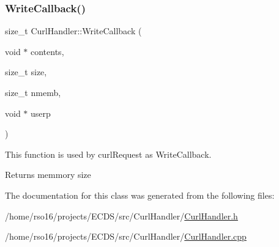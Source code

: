 \subsubsection{\texorpdfstring{Write\+Callback()}{WriteCallback()}}
{\footnotesize\ttfamily size\+\_\+t Curl\+Handler\+::\+Write\+Callback (\begin{DoxyParamCaption}\item[{void $\ast$}]{contents,  }\item[{size\+\_\+t}]{size,  }\item[{size\+\_\+t}]{nmemb,  }\item[{void $\ast$}]{userp }\end{DoxyParamCaption})\hspace{0.3cm}{\ttfamily [static]}}



This function is used by curl\+Request as Write\+Callback. 

\begin{DoxyReturn}{Returns}
memmory size 
\end{DoxyReturn}


The documentation for this class was generated from the following files\+:\begin{DoxyCompactItemize}
\item 
/home/rso16/projects/\+E\+C\+D\+S/src/\+Curl\+Handler/\hyperlink{CurlHandler_8h}{Curl\+Handler.\+h}\item 
/home/rso16/projects/\+E\+C\+D\+S/src/\+Curl\+Handler/\hyperlink{CurlHandler_8cpp}{Curl\+Handler.\+cpp}\end{DoxyCompactItemize}
